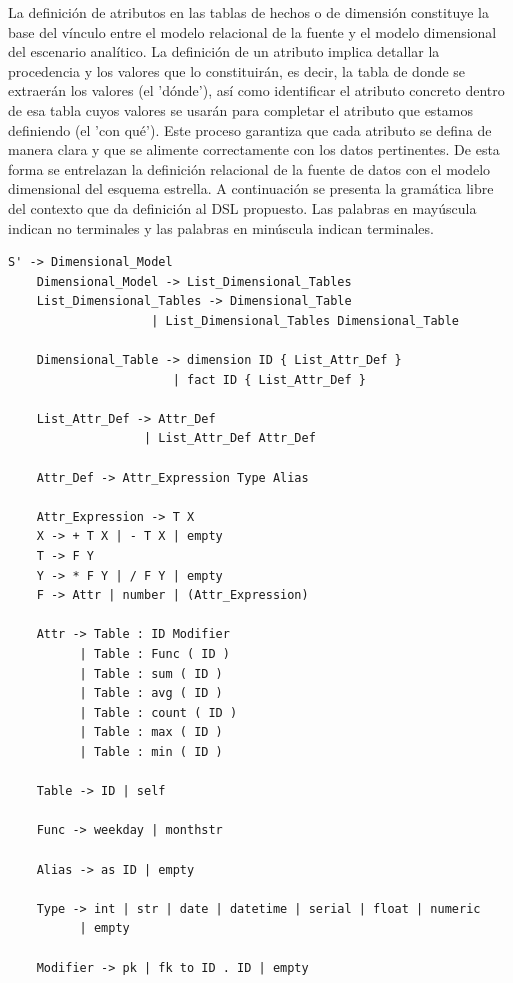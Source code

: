 La definici\'on de atributos en las tablas de hechos o de dimensi\'on constituye la base del v\'inculo entre 
el modelo relacional de la fuente y el modelo dimensional del escenario analítico. La definición de un atributo 
implica detallar la procedencia y los valores que lo constituirán, es decir, la tabla de donde se extraerán los 
valores (el 'dónde'), 
así como identificar el atributo concreto dentro de esa tabla cuyos valores se usarán para completar el atributo 
que estamos definiendo (el 'con qué'). Este proceso garantiza que cada atributo se defina de manera clara y que 
se alimente correctamente con los datos pertinentes. De esta forma se entrelazan la definici\'on relacional 
de la fuente de datos con el modelo dimensional del esquema estrella. A continuación se presenta la gramática 
libre del contexto que da definición al DSL propuesto. Las palabras en may\'uscula indican no terminales y 
las palabras en min\'uscula indican terminales.

\begin{lstlisting}[caption={Gram\'atica libre del contexto del lenguaje de dominio espec\'ifico}]
    S' -> Dimensional_Model
    Dimensional_Model -> List_Dimensional_Tables
    List_Dimensional_Tables -> Dimensional_Table
                    | List_Dimensional_Tables Dimensional_Table

    Dimensional_Table -> dimension ID { List_Attr_Def }
                       | fact ID { List_Attr_Def }

    List_Attr_Def -> Attr_Def
                   | List_Attr_Def Attr_Def

    Attr_Def -> Attr_Expression Type Alias

    Attr_Expression -> T X
    X -> + T X | - T X | empty
    T -> F Y
    Y -> * F Y | / F Y | empty
    F -> Attr | number | (Attr_Expression)

    Attr -> Table : ID Modifier
          | Table : Func ( ID )
          | Table : sum ( ID )
          | Table : avg ( ID )
          | Table : count ( ID )
          | Table : max ( ID )
          | Table : min ( ID )

    Table -> ID | self

    Func -> weekday | monthstr

    Alias -> as ID | empty

    Type -> int | str | date | datetime | serial | float | numeric 
          | empty

    Modifier -> pk | fk to ID . ID | empty
\end{lstlisting}

